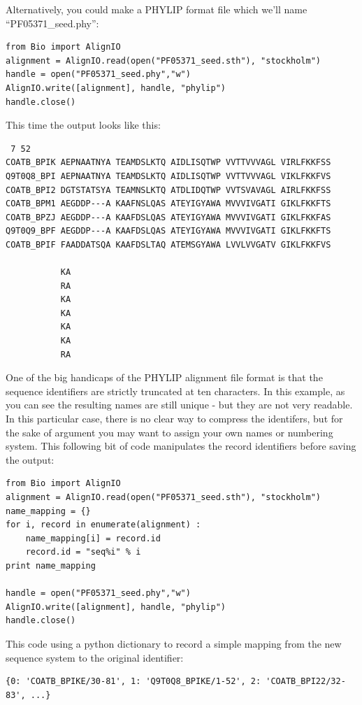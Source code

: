 \documentclass{report}
\begin{document}
Alternatively, you could make a PHYLIP format file which we'll name ``PF05371\_seed.phy'':

\begin{verbatim}
from Bio import AlignIO
alignment = AlignIO.read(open("PF05371_seed.sth"), "stockholm")
handle = open("PF05371_seed.phy","w")
AlignIO.write([alignment], handle, "phylip")
handle.close()
\end{verbatim}

This time the output looks like this:

\begin{verbatim}
 7 52
COATB_BPIK AEPNAATNYA TEAMDSLKTQ AIDLISQTWP VVTTVVVAGL VIRLFKKFSS
Q9T0Q8_BPI AEPNAATNYA TEAMDSLKTQ AIDLISQTWP VVTTVVVAGL VIKLFKKFVS
COATB_BPI2 DGTSTATSYA TEAMNSLKTQ ATDLIDQTWP VVTSVAVAGL AIRLFKKFSS
COATB_BPM1 AEGDDP---A KAAFNSLQAS ATEYIGYAWA MVVVIVGATI GIKLFKKFTS
COATB_BPZJ AEGDDP---A KAAFDSLQAS ATEYIGYAWA MVVVIVGATI GIKLFKKFAS
Q9T0Q9_BPF AEGDDP---A KAAFDSLQAS ATEYIGYAWA MVVVIVGATI GIKLFKKFTS
COATB_BPIF FAADDATSQA KAAFDSLTAQ ATEMSGYAWA LVVLVVGATV GIKLFKKFVS

           KA
           RA
           KA
           KA
           KA
           KA
           RA
\end{verbatim}

One of the big handicaps of the PHYLIP alignment file format is that the sequence identifiers are strictly truncated at ten characters.  In this example, as you can see the resulting names are still unique - but they are not very readable.  In this particular case, there is no clear way to compress the identifers, but for the sake of argument you may want to assign your own names or numbering system.  This following bit of code manipulates the record identifiers before saving the output:

\begin{verbatim}
from Bio import AlignIO
alignment = AlignIO.read(open("PF05371_seed.sth"), "stockholm")
name_mapping = {}
for i, record in enumerate(alignment) :
    name_mapping[i] = record.id
    record.id = "seq%i" % i
print name_mapping

handle = open("PF05371_seed.phy","w")
AlignIO.write([alignment], handle, "phylip")
handle.close()
\end{verbatim}

\noindent This code using a python dictionary to record a simple mapping from the new sequence system to the original identifier:
\begin{verbatim}
{0: 'COATB_BPIKE/30-81', 1: 'Q9T0Q8_BPIKE/1-52', 2: 'COATB_BPI22/32-83', ...}
\end{verbatim}
\end{document}
